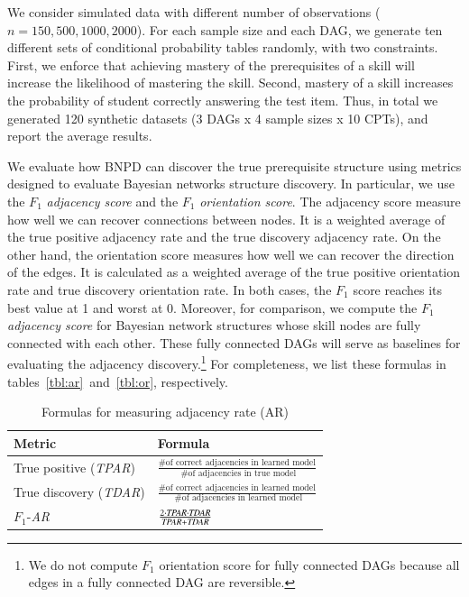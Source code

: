\documentclass{edm_template}
\begin{document}
{	We consider simulated data with different number of observations ($n=150, 500, 1000, 2000$).
	For each sample size and each  DAG, we generate ten different sets of conditional probability tables
	randomly, with two  constraints.
	First, we enforce that achieving mastery of the prerequisites of a skill will increase the likelihood of mastering the skill.
	Second, mastery of a skill increases the probability of student correctly answering the test item. 
	Thus, in total we generated 120 synthetic datasets (3 DAGs x 4 sample sizes x 10 CPTs), and  report the average results.
	
	
	We evaluate how BNPD can discover the true prerequisite structure using metrics designed to evaluate Bayesian networks structure discovery.
	In particular, we use the $F_1$ \emph{adjacency score} and the $F_1$ \emph{orientation score}.
	The adjacency score measure how well we can recover connections between nodes.
	It is a weighted average of the true positive adjacency rate and the true discovery adjacency rate.
	On the other hand, the orientation score measures how well we can recover the direction of the edges.
	It is calculated as a weighted average of the true positive orientation rate and true discovery orientation rate.
	In both cases, the $F_1$ score reaches its best value at 1 and worst at 0. 
	Moreover, for comparison, we compute the $F_1$ \emph{adjacency score} for Bayesian network structures whose skill nodes are fully connected with each other. 
	These fully connected DAGs will serve as baselines for evaluating the adjacency discovery.\footnote{We do not compute $F_1$ orientation score for fully connected DAGs because all edges in a fully connected DAG are reversible.}
	For completeness, we list these formulas in tables~\ref{tbl:ar}~and~\ref{tbl:or}, respectively.
	
	
	\begin{table}[ht]
		\centering
		\caption{Formulas for measuring adjacency rate (AR) \label{tbl:ar}}
		\label{my-label}
		\begin{tabular}{@{}ll@{}}
			\toprule
			Metric & Formula \\ \midrule
			True positive    (\emph{TPAR}) & $\frac{ \text{\# of correct adjacencies in learned model} } { \text{ \# of adjacencies in true model} }$  \\
			True discovery (\emph{TDAR}) &  $\frac{ \text{\# of correct adjacencies in learned model} } { \text{ \# of adjacencies in learned model} }$ \\
			$F_1$-\textit{AR} &  $\frac{2\cdot \text{\emph{TPAR}} \cdot \text{\emph{TDAR}}} {\text{\emph{TPAR}}+\text{\emph{TDAR}}}$  \\
			\bottomrule
		\end{tabular}
	\end{table}
	
}
\end{document}
